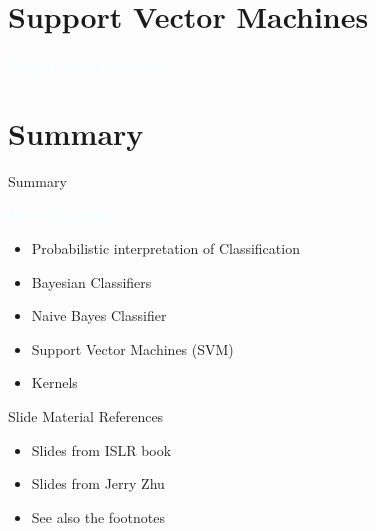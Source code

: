 \documentclass{beamer}
\newcommand{\tblue}[1]{{\Large {\textcolor{azure}{#1}}}}
\newcommand{\thblue}[1]{{\Huge {\textcolor{azure}{#1}}}}
\begin{document}
\section{Support Vector Machines}
\begin{frame}{} 
    \begin{center}
        \thblue{Support Vector Machines}
    \end{center}
\end{frame}


\section{Summary}
\begin{frame}{Summary}

\tblue{Major Concepts:}
\begin{itemize}
    \item Probabilistic interpretation of Classification
    \item Bayesian Classifiers
    \item Naive Bayes Classifier
    \item Support Vector Machines (SVM)
    \item Kernels
\end{itemize}
\end{frame}

\begin{frame}{Slide Material References}
\begin{itemize}
    \item Slides from ISLR book
    \item Slides from Jerry Zhu
    \item See also the footnotes
\end{itemize}
\end{frame}
\end{document}
